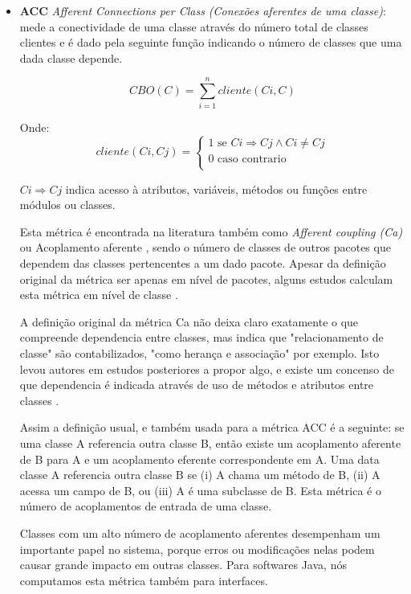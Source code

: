 \begin{itemize}
  \item {\bf ACC} {\it Afferent Connections per Class (Conexões aferentes de
    uma classe)}: mede a conectividade de uma classe através do número total de
    classes clientes e é dado pela seguinte função indicando o número de
    classes que uma dada classe depende.

\[ CBO(C) = \sum_{i=1}^{n} cliente(Ci, C) \]

Onde:
\[ cliente(Ci, Cj) =
  \begin{cases}
    1 \text{ se } Ci \Rightarrow Cj \wedge Ci \neq Cj \\
    0 \text{ caso contrario} \\
  \end{cases}
\]

$ Ci \Rightarrow Cj $ indica acesso à atributos, variáveis, métodos ou funções
entre módulos ou classes.

Esta métrica é encontrada na literatura também como {\it Afferent coupling
(Ca)} ou Acoplamento aferente \cite{Martin1994}, sendo o número de classes de
outros pacotes que dependem das classes pertencentes a um dado pacote.  Apesar
da definição original da métrica ser apenas em nível de pacotes, alguns estudos
calculam esta métrica em nível de classe \cite{Ferreira2012}.

A definição original da métrica Ca \cite{Martin1994} não deixa claro exatamente
o que compreende dependencia entre classes, mas indica que "relacionamento de
classe" são contabilizados, "como herança e associação" por exemplo. Isto levou
autores em estudos posteriores a propor algo, e existe um concenso de que
dependencia é indicada através de uso de métodos e atributos entre classes
\cite{Briand1999Unified} \cite{Fenton2014} \cite{Ferreira2008}.

Assim a definição usual, e também usada para a métrica ACC é a seguinte:   se
uma classe A referencia outra classe B, então existe um acoplamento aferente de
B para A e um acoplamento eferente correspondente em A. Uma data classe A
referencia outra classe B se (i) A chama um método de B, (ii) A acessa um campo
de B, ou (iii) A é uma subclasse de B. Esta métrica é o número de acoplamentos
de entrada de uma classe.

Classes com um alto número de acoplamento aferentes desempenham um importante
papel no sistema, porque erros ou modificações nelas podem causar grande
impacto em outras classes. Para softwares Java, nós computamos esta métrica
também para interfaces.


\end{itemize}

